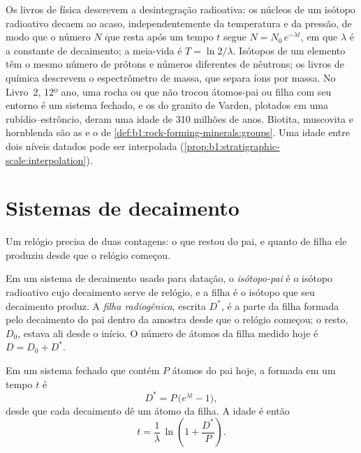 \begin{recall}
Os livros de física descrevem a desintegração radioativa: os núcleos de um isótopo radioativo
decaem ao acaso, independentemente da temperatura e da pressão, de modo que o número $N$ que
resta após um tempo $t$ segue $N = N_0\,e^{-\lambda t}$, em que $\lambda$ é a constante de
decaimento; a meia-vida é $T = \ln 2/\lambda$. Isótopos de um elemento têm o mesmo número de
prótons e números diferentes de nêutrons; os livros de química descrevem o espectrômetro de
massa, que separa íons por massa. No Livro~2, 12º ano, uma rocha ou  que não trocou
átomos-pai ou filha com seu entorno é um sistema fechado, e os  do granito de Varden,
plotados em uma  rubídio--estrôncio, deram uma idade de 310 milhões de anos. Biotita,
muscovita e hornblenda são as  e o  de \cref{def:b1:rock-forming-minerals:groups}.
Uma idade entre dois níveis datados pode ser interpolada
(\cref{prop:b1:stratigraphic-scale:interpolation}).
\end{recall}

\section{Sistemas de decaimento}\label{sec:b1:radiometric-methods:systems}

Um relógio precisa de duas contagens: o que restou do pai, e quanto de filha ele produziu desde
que o relógio começou.

\begin{definition}\label{def:b1:radiometric-methods:radiogenic}
Em um sistema de decaimento usado para datação, o \emph{isótopo-pai} é o
isótopo radioativo cujo decaimento serve de relógio, e a filha é o isótopo que seu decaimento
produz. A \emph{filha radiogênica}, escrita $D^*$, é a parte da filha
formada pelo decaimento do pai dentro da amostra desde que o relógio começou; o resto, $D_0$,
estava ali desde o início. O número de átomos da filha medido hoje é $D = D_0 + D^*$.
\end{definition}

\begin{proposition}\label{prop:b1:radiometric-methods:growth}
Em um sistema fechado que contém $P$ átomos do pai hoje, a  formada em um
tempo $t$ é
\[
  D^* = P\,\bigl(e^{\lambda t} - 1\bigr),
\]
desde que cada decaimento dê um átomo da filha. A idade é então
\[
  t = \frac{1}{\lambda}\,\ln\!\left(1 + \frac{D^*}{P}\right).
\]
\end{proposition}

